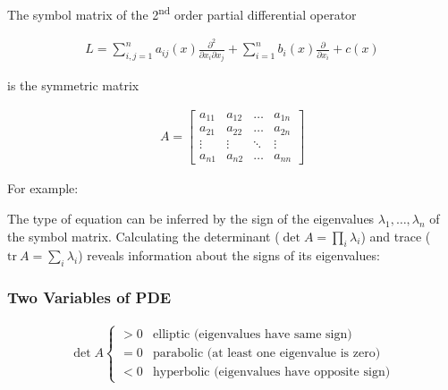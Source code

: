 
The symbol matrix of the 2\textsuperscript{nd} order partial differential operator

\begin{align*}
    L=\sum_{i,j=1}^{n}a_{ij}(x)\frac{\partial^2}{\partial x_i \partial x_j}+\sum_{i=1}^n b_i(x)\frac{\partial}{\partial x_i}+c(x)
\end{align*}

is the symmetric matrix

\begin{align*}
    A=
    \begin{bmatrix}
        a_{11} & a_{12} & \ldots & a_{1n} \\
        a_{21} & a_{22} & \ldots & a_{2n} \\
        \vdots & \vdots & \ddots & \vdots \\
        a_{n1} & a_{n2} & \ldots & a_{nn}
    \end{bmatrix}
\end{align*}

For example:

\begin{center}
\end{center}

The type of equation can be inferred by the sign of the eigenvalues $\lambda_1,\ldots,\lambda_n$ of the symbol matrix.
Calculating the determinant ($\det A=\prod_i \lambda_i$) and trace ($\mathrm{tr}\ A=\sum_i \lambda_i$)
reveals information about the signs of its eigenvalues:

\subsubsection{Two Variables of PDE}

\begin{align*}
    \det A
    \left\{
    \begin{matrix}
        >0 & \text{elliptic (eigenvalues have same sign)}       \\
        =0 & \text{parabolic (at least one eigenvalue is zero)} \\
        <0 & \text{hyperbolic (eigenvalues have opposite sign)}
    \end{matrix}
    \right.
\end{align*}

